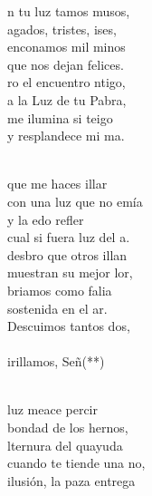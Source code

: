 \begin{cancion}%
	n tu luz tamos musos,\\
	agados, tristes, ises,\\
	enconamos mil minos\\
	que nos dejan felices.\\
	ro el encuentro ntigo,\\
	a la Luz de tu Pabra,\\
	me ilumina si teigo\\
	y resplandece mi ma.\\\jump\\
	\begin{chorus}%
	 que  me haces illar \\
	con una luz que no emía\\
	y la edo refler\\
	cual si fuera luz del a. \\
	desbro que otros illan\\
	muestran su mejor lor,\\
	briamos como falia\\
	sostenida en el ar.\\
	Descuimos tantos dos,\\
{}\vspace*{-0.4cm}\\
	irillamos, Señ(**) \\
	\end{chorus}%
	\jump\\
	 luz meace percir\\
	 bondad de los hernos,\\
	lternura del quayuda\\
	cuando te tiende una no,\\
	 ilusión, la paza entrega\\

\end{cancion}
